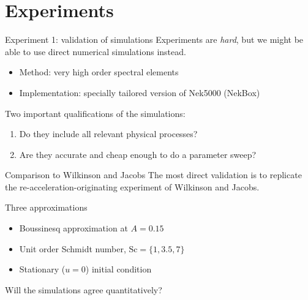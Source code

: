 \documentclass[12pt]{beamer}
\begin{document}
\section{Experiments}

\begin{frame}{Experiment 1: validation of simulations}
Experiments are \textit{hard}, but we might be able to use direct numerical simulations
 instead.
\begin{itemize}
  \item Method: very high order spectral elements
  \item Implementation: specially tailored version of Nek5000 (NekBox)
\end{itemize}
\vspace{20pt}\pause

Two important qualifications of the simulations:
\begin{enumerate}
  \item Do they include all relevant physical processes?
  \item Are they accurate and cheap enough to do a parameter sweep?
\end{enumerate}
\end{frame}

\begin{frame}{Comparison to Wilkinson and Jacobs}
The most direct validation is to replicate the re-acceleration-originating experiment of Wilkinson and Jacobs.

\begin{block}{Three approximations}
\begin{itemize}
  \item Boussinesq approximation at $A = 0.15$
  \item Unit order Schmidt number, $\text{Sc} = \{1,3.5,7\}$
  \item Stationary ($u = 0$) initial condition
\end{itemize}
\end{block}

\begin{exampleblock}{}
Will the simulations agree quantitatively?
\end{exampleblock}
\end{frame}
\end{document}

